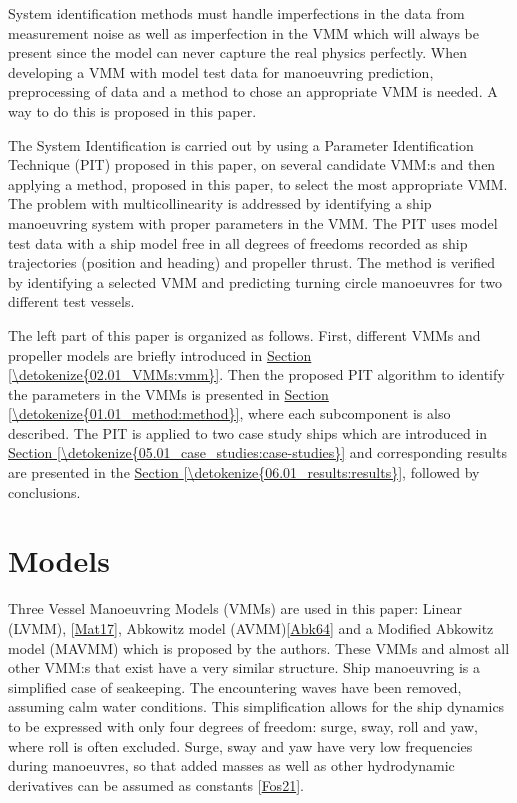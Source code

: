 \documentclass[review]{elsarticle}
\begin{document}
\sphinxAtStartPar
System identification methods must handle imperfections in the data from measurement noise as well as imperfection in the VMM which will always be present since the model can never capture the real physics perfectly. When developing a VMM with model test data for manoeuvring prediction, preprocessing of data and a method to chose an appropriate VMM is needed. A way to do this is proposed in this paper.

\sphinxAtStartPar
The System Identification is carried out by using a Parameter Identification Technique (PIT) proposed in this paper, on several candidate VMM:s and then applying a method, proposed in this paper, to select the most appropriate VMM. The problem with multicollinearity is addressed by identifying a ship manoeuvring system with proper parameters in the VMM.
The PIT uses model test data with a ship model free in all degrees of freedoms recorded as ship trajectories (position and heading) and propeller thrust. The method is verified by identifying a selected VMM and predicting turning circle manoeuvres for two different test vessels.

\sphinxAtStartPar
The left part of this paper is organized as follows. First, different VMMs and propeller models are briefly introduced in \hyperref[\detokenize{02.01_VMMs:vmm}]{Section \ref{\detokenize{02.01_VMMs:vmm}}}. Then the proposed PIT algorithm to identify the parameters in the VMMs is presented in \hyperref[\detokenize{01.01_method:method}]{Section \ref{\detokenize{01.01_method:method}}}, where each subcomponent is also described. The PIT is applied to two case study ships which are introduced in \hyperref[\detokenize{05.01_case_studies:case-studies}]{Section \ref{\detokenize{05.01_case_studies:case-studies}}} and corresponding results are presented in the \hyperref[\detokenize{06.01_results:results}]{Section \ref{\detokenize{06.01_results:results}}}, followed by conclusions.


\section{Models}
\label{\detokenize{02.01_VMMs:models}}\label{\detokenize{02.01_VMMs:vmm}}\label{\detokenize{02.01_VMMs::doc}}
\sphinxAtStartPar
Three Vessel Manoeuvring Models (VMMs) are used in this paper: Linear (LVMM), {[}\hyperlink{cite.bibligraphy:id40}{Mat17}{]}, Abkowitz model (AVMM){[}\hyperlink{cite.bibligraphy:id25}{Abk64}{]} and a Modified Abkowitz model (MAVMM) which is  proposed by the authors. These VMMs and almost all other VMM:s that exist have a very similar structure. Ship manoeuvring is a simplified case of seakeeping. The encountering waves have been removed, assuming calm water conditions. This simplification allows for the ship dynamics to be expressed with only four degrees of freedom: surge, sway, roll and yaw, where roll is often excluded. Surge, sway and yaw have very low frequencies during manoeuvres, so that added masses as well as other hydrodynamic derivatives can be assumed as constants {[}\hyperlink{cite.bibligraphy:id87}{Fos21}{]}.
\end{document}
